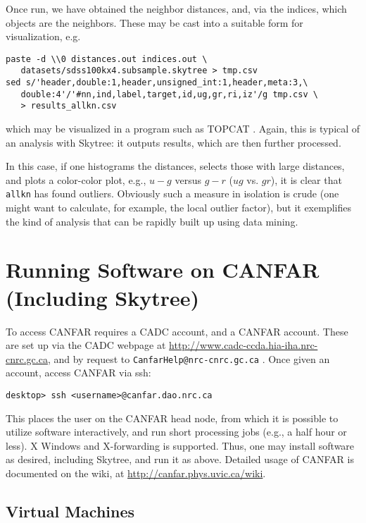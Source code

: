 Once run, we have obtained the neighbor distances, and, via the indices, which objects are the neighbors. These may be cast into a suitable form for visualization, e.g.

\begin{verbatim}
paste -d \\0 distances.out indices.out \
   datasets/sdss100kx4.subsample.skytree > tmp.csv
sed s/'header,double:1,header,unsigned_int:1,header,meta:3,\
   double:4'/'#nn,ind,label,target,id,ug,gr,ri,iz'/g tmp.csv \
   > results_allkn.csv
\end{verbatim}

\noindent which may be visualized in a program such as TOPCAT \citep{taylor:topcat}. Again, this is typical of an analysis with Skytree: it outputs results, which are then further processed.

In this case, if one histograms the distances, selects those with large distances, and plots a color-color plot, e.g., $u-g$ versus $g-r$ ($ug$ vs. $gr$), it is clear that {\tt allkn} has found outliers. Obviously such a measure in isolation is crude (one might want to calculate, for example, the local outlier factor), but it exemplifies the kind of analysis that can be rapidly built up using data mining.

\section{Running Software on CANFAR (Including Skytree)}

To access CANFAR requires a CADC account, and a CANFAR account. These are set up via the CADC webpage at \url{http://www.cadc-ccda.hia-iha.nrc-cnrc.gc.ca}, and by request to {\tt CanfarHelp@nrc-cnrc.gc.ca} . Once given an account, access CANFAR via ssh:

\begin{verbatim}
desktop> ssh <username>@canfar.dao.nrc.ca
\end{verbatim}

This places the user on the CANFAR head node, from which it is possible to utilize software interactively, and run short processing jobs (e.g., a half hour or less). X Windows and X-forwarding is supported. Thus, one may install software as desired, including Skytree, and run it as above. Detailed usage of CANFAR is documented on the wiki, at \url{http://canfar.phys.uvic.ca/wiki}.

\subsection{Virtual Machines}

